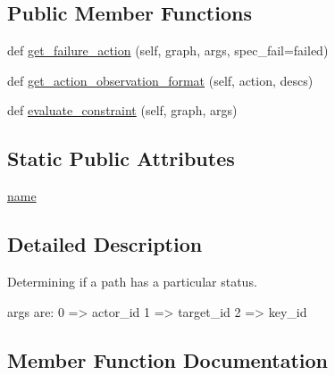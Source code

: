 \subsection*{Public Member Functions}
\begin{DoxyCompactItemize}
\item 
def \hyperlink{classlight__chats_1_1graph_1_1LockedWithConstraint_adf4e0502c0dea2fb13c19779c9f393c5}{get\+\_\+failure\+\_\+action} (self, graph, args, spec\+\_\+fail=\textquotesingle{}failed\textquotesingle{})
\item 
def \hyperlink{classlight__chats_1_1graph_1_1LockedWithConstraint_af7d3c8160d19a1e5ec2ce62d11b54882}{get\+\_\+action\+\_\+observation\+\_\+format} (self, action, descs)
\item 
def \hyperlink{classlight__chats_1_1graph_1_1LockedWithConstraint_a563e85b8f768c315556c077aa2aed7bf}{evaluate\+\_\+constraint} (self, graph, args)
\end{DoxyCompactItemize}
\subsection*{Static Public Attributes}
\begin{DoxyCompactItemize}
\item 
\hyperlink{classlight__chats_1_1graph_1_1LockedWithConstraint_ab4ccf9bea5ce492ae5095b06719cf812}{name}
\end{DoxyCompactItemize}


\subsection{Detailed Description}
\begin{DoxyVerb}Determining if a path has a particular status.

args are:     0 => actor_id     1 => target_id     2 => key_id
\end{DoxyVerb}
 

\subsection{Member Function Documentation}
\mbox{\label{classlight__chats_1_1graph_1_1LockedWithConstraint_a563e85b8f768c315556c077aa2aed7bf}} 
